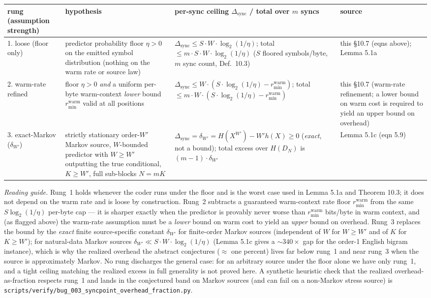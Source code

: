 \documentclass[
]{article}
\begin{document}
\begingroup\footnotesize\sloppy
\setlength{\tabcolsep}{4pt}
\noindent\begin{tabular}{@{}p{2.0cm}p{3.7cm}p{3.6cm}p{2.6cm}@{}}
\hline
\textbf{rung (assumption strength)} & \textbf{hypothesis} &
\textbf{per-sync ceiling $\Delta_{\mathrm{sync}}$ / total over $m$ syncs} &
\textbf{source}\\
\hline
1. loose (floor only)
& predictor probability floor $\eta>0$ on the emitted symbol
distribution (nothing on the warm rate or source law)
& $\Delta_{\mathrm{sync}}\le S\cdot W\cdot\log_2(1/\eta)$; total
$\le m\cdot S\cdot W\cdot\log_2(1/\eta)$ ($S$ floored symbols/byte,
$m$ sync count, Def.\ 10.3)
& this §10.7 (eqns above); Lemma 5.1a\\
2. warm-rate refined
& floor $\eta>0$ \emph{and} a uniform per-byte warm-context
\emph{lower} bound $r^{\mathrm{warm}}_{\min}$ valid at all positions
& $\Delta_{\mathrm{sync}}\le W\cdot(S\cdot\log_2(1/\eta)-r^{\mathrm{warm}}_{\min})$;
total $\le m\cdot W\cdot(S\cdot\log_2(1/\eta)-r^{\mathrm{warm}}_{\min})$
& this §10.7 (warm-rate refinement; a lower bound on warm cost is
required to yield an upper bound on overhead)\\
3. exact-Markov ($\delta_{W'}$)
& strictly stationary order-$W'$ Markov source, $W$-bounded predictor
with $W\ge W'$ outputting the true conditional, $K\ge W'$, full
sub-blocks $N=mK$
& $\Delta_{\mathrm{sync}}=\delta_{W'}=H(X^{W'})-W'h(X)\ge 0$
(\emph{exact}, not a bound); total excess over $H(D_N)$ is
$(m-1)\cdot\delta_{W'}$
& Lemma 5.1c (eqn 5.9)\\
\hline
\end{tabular}
\par\endgroup

\emph{Reading guide.} Rung~1 holds whenever the coder runs under the
floor and is the worst case used in Lemma 5.1a and Theorem 10.3; it
does not depend on the warm rate and is loose by construction. Rung~2
subtracts a guaranteed warm-context rate floor $r^{\mathrm{warm}}_{\min}$
from the same $S\log_2(1/\eta)$ per-byte cap --- it is sharper exactly
when the predictor is provably never worse than $r^{\mathrm{warm}}_{\min}$
bits/byte in warm context, and (as flagged above) the warm-rate
assumption must be a \emph{lower} bound on warm cost to yield an
\emph{upper} bound on overhead. Rung~3 replaces the bound by the
\emph{exact} finite source-specific constant $\delta_{W'}$ for
finite-order Markov sources (independent of $W$ for $W\ge W'$ and of
$K$ for $K\ge W'$); for natural-data Markov sources $\delta_{W'}\ll
S\cdot W\cdot\log_2(1/\eta)$ (Lemma 5.1c gives a $\sim340\times$ gap
for the order-1 English bigram instance), which is why the realized
overhead the abstract conjectures ($\approx$ one percent) lives far
below rung~1 and near rung~3 when the source is approximately Markov.
No rung discharges the general case: for an arbitrary source under the
floor alone we have only rung~1, and a tight ceiling matching the
realized excess in full generality is not proved here. A synthetic
heuristic check that the realized overhead-as-fraction respects rung~1
and lands in the conjectured band on Markov sources (and can fail on a
non-Markov stress source) is
\texttt{scripts/verify/bug\_003\_syncpoint\_overhead\_fraction.py}.
\end{document}
